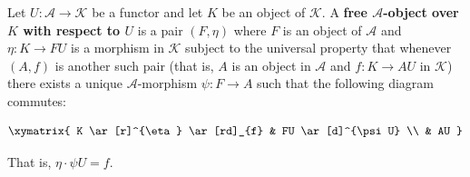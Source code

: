 Let $U: \mathcal{A} \longrightarrow \mathcal{K}$ be a functor and let $K$ be an object of $\mathcal{K}$. A \textbf{free $\mathcal{A}$-object over $K$ with respect to $U$} is a pair $(F, \eta)$ where $F$ is an object of $\mathcal{A}$ and $\eta: K \longrightarrow FU$ is a morphism in $\mathcal{K}$ subject to the universal property that whenever $(A, f)$ is another such pair (that is, $A$ is an object in $\mathcal{A}$ and $f: K \longrightarrow AU$ in $\mathcal{K}$) there exists a unique $\mathcal{A}$-morphism $\psi: F \longrightarrow A$ such that the following diagram commutes:

$$
\xymatrix{
K \ar[r]^{\eta} \ar[rd]_{f} & FU \ar[d]^{\psi U} \\
& AU
}
$$

That is, $\eta \cdot \psi U = f$.
